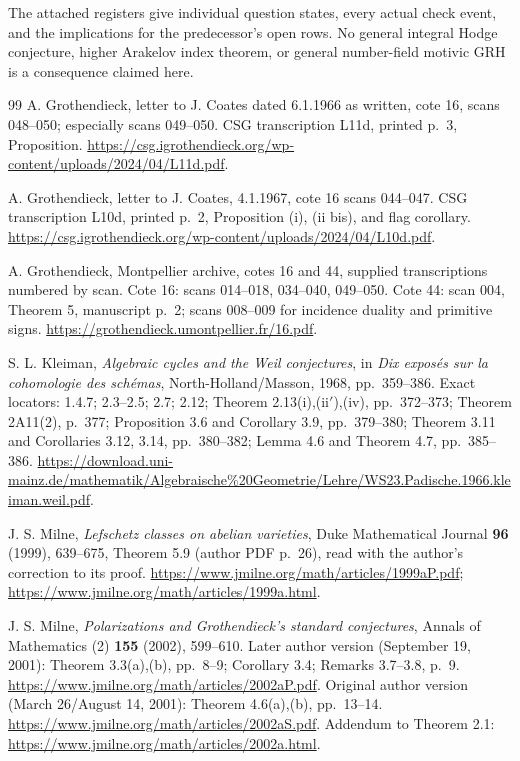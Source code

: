 \documentclass[11pt,a4paper]{article}
\theoremstyle{definition}
\theoremstyle{remark}
\begin{document}
The attached registers give individual question states, every actual
check event, and the implications for the predecessor's open rows.
No general integral Hodge conjecture, higher Arakelov index theorem,
or general number-field motivic GRH is a consequence claimed here.



\begin{thebibliography}{99}
A. Grothendieck, letter to J. Coates dated 6.1.1966 as written,
cote 16, scans 048--050; especially scans 049--050.
CSG transcription L11d, printed p.~3, Proposition.
\url{https://csg.igrothendieck.org/wp-content/uploads/2024/04/L11d.pdf}.

A. Grothendieck, letter to J. Coates, 4.1.1967,
cote 16 scans 044--047. CSG transcription L10d,
printed p.~2, Proposition (i), (ii bis), and flag corollary.
\url{https://csg.igrothendieck.org/wp-content/uploads/2024/04/L10d.pdf}.

A. Grothendieck, Montpellier archive, cotes 16 and 44,
supplied transcriptions numbered by scan.
Cote 16: scans 014--018, 034--040, 049--050.
Cote 44: scan 004, Theorem 5, manuscript p.~2;
scans 008--009 for incidence duality and primitive signs.
\url{https://grothendieck.umontpellier.fr/16.pdf}.

S. L. Kleiman, \emph{Algebraic cycles and the Weil conjectures},
in \emph{Dix expos\'es sur la cohomologie des sch\'emas},
North-Holland/Masson, 1968, pp.~359--386.
Exact locators: 1.4.7; 2.3--2.5; 2.7; 2.12;
Theorem 2.13(i),(ii$'$),(iv), pp.~372--373;
Theorem 2A11(2), p.~377;
Proposition 3.6 and Corollary 3.9, pp.~379--380;
Theorem 3.11 and Corollaries 3.12, 3.14, pp.~380--382;
Lemma 4.6 and Theorem 4.7, pp.~385--386.
\url{https://download.uni-mainz.de/mathematik/Algebraische%20Geometrie/Lehre/WS23.Padische.1966.kleiman.weil.pdf}.

J. S. Milne, \emph{Lefschetz classes on abelian varieties},
Duke Mathematical Journal \textbf{96} (1999), 639--675,
Theorem 5.9 (author PDF p.~26), read with the author's correction
to its proof.
\url{https://www.jmilne.org/math/articles/1999aP.pdf};
\url{https://www.jmilne.org/math/articles/1999a.html}.

J. S. Milne, \emph{Polarizations and Grothendieck's standard
conjectures}, Annals of Mathematics (2) \textbf{155} (2002), 599--610.
Later author version (September 19, 2001):
Theorem 3.3(a),(b), pp.~8--9; Corollary 3.4;
Remarks 3.7--3.8, p.~9.
\url{https://www.jmilne.org/math/articles/2002aP.pdf}.
Original author version (March 26/August 14, 2001):
Theorem 4.6(a),(b), pp.~13--14.
\url{https://www.jmilne.org/math/articles/2002aS.pdf}.
Addendum to Theorem 2.1:
\url{https://www.jmilne.org/math/articles/2002a.html}.


\end{thebibliography}
\end{document}

